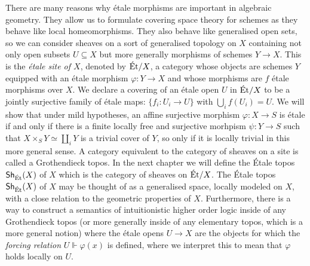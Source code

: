 There are many reasons why \'etale morphisms are important in algebraic geometry. They allow us to formulate covering space theory for schemes as they behave like local homeomorphisms. They also behave like generalised open sets, so we can consider sheaves on a sort of generalised topology on $X$ containing not only open subsets $U \subseteq X$ but more generally morphisms of schemes $Y \to X$. This is the \textit{\'etale site of $X$}, denoted by $\text{\'Et}/X$, a category whose objects are schemes $Y$ equipped with an \'etale morphism $\varphi \colon Y \to X$ and whose morphisms are $f$ \'etale morphisms over $X$. We declare a covering of an \'etale open $U$ in $\text{\'Et}/X$ to be a jointly surjective family of \'etale maps: $\{f_i \colon U_i \to U\}$ with $\bigcup_i f(U_i) = U$. We will show that under mild hypotheses, an affine surjective morphism $\varphi \colon X \to S$ is \'etale if and only if there is a finite locally free and surjective morhpism $\psi \colon Y \to S$ such that $X \times_S Y \simeq \coprod_i Y$ is a trivial cover of $Y$, so only if it is locally trivial in this more general sense. A category equivalent to the category of sheaves on a site is called a Grothendieck topos. In the next chapter we will define the \'Etale topos $\operatorname{\mathsf{Sh}}_{\text{\'Et}}(X)$ of $X$ which is the category of sheaves on $\text{\'Et}/X$. The \'Etale topos $\mathsf{Sh}_{\text{\'Et}}(X)$ of $X$ may be thought of as a generalised space, locally modeled on $X$, with a close relation to the geometric properties of $X$. Furthermore, there is a way to construct a semantics of intuitionistic higher order logic inside of any Grothendieck topos (or more generally inside of any elementary topos, which is a more general notion) where the \'etale opens $U \to X$ are the objects for which the \textit{forcing relation} $U \Vdash \varphi(x)$ is defined, where we interpret this to mean that $\varphi$ holds locally on $U$.



